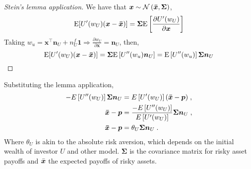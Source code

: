 \documentclass{article}
\newenvironment{boxedproof}
  {\begin{mdframed}\begin{proof}}
  {\end{proof}\end{mdframed}}
\begin{document}
\begin{boxedproof}[Stein's lemma application]
	We have that $\bm{x}\sim\mathcal{N}\left(\bm{\Bar{x}},\bm{\Sigma}\right)$, 
	\begin{equation*}
		\begin{split}
			\mathrm{E}[U'(w_{U})(\bm{x}-\bm{\Bar{x}})] &= \bm{\Sigma}\mathrm{E}\left[ \frac{\partial U'(w_{U})}{\partial \bm{x}}\right]\\
		\end{split}
	\end{equation*}
	Taking $w_{u} = \bm{x^{\intercal}}\bm{n}_{U} + n^{f}_{U}\bm{1}\Rightarrow \frac{\partial w_{U}}{\partial \bm{x}} = \bm{n}_{U}$, then,
	\begin{equation*}
		\mathrm{E}[U'(w_{U})(\bm{x}-\bm{\Bar{x}})] = \bm{\Sigma}\mathrm{E}\left[U''(w_{u})\bm{n}_{U}\right] = \mathrm{E}\left[U''(w_{u})\right]\bm{\Sigma}\bm{n}_{U}
	\end{equation*}
\end{boxedproof}
Substituting the lemma application,
\begin{equation}
	\begin{split}
		-E\left[U''(w_U)\right]\bm{\Sigma}\bm{n}_{U}&=E\left[U'(w_U)\right](\bm{\Bar{x}}-\bm{p})\;,\\
		\bm{\Bar{\bm{x}}}-\bm{p} &= \frac{-E\left[U''(w_U)\right]}{E\left[U'(w_U)\right]}\bm{\Sigma}\bm{n}_U\;,\\
		\bm{\Bar{\bm{x}}}-\bm{p} &= \theta_U\bm{\Sigma}\bm{n}_U\;.
	\end{split}
	\label{eq:unrestricted}
\end{equation}
Where $\theta_{U}$ is akin to the absolute risk aversion, which depends on the initial wealth of investor $U$ and other model. $\bm{\Sigma}$ is the covariance matrix for risky asset payoffs and $\Bar{\bm{x}}$ the expected payoffs of risky assets.\\ 
\end{document}
